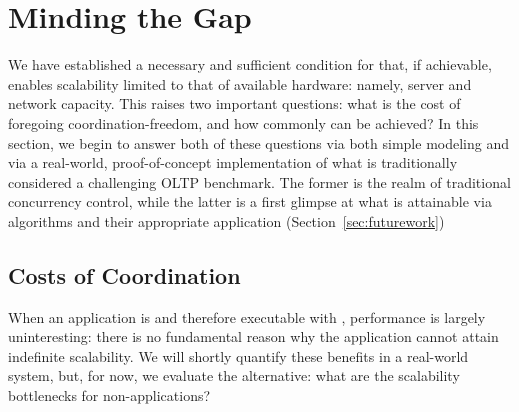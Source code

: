 
\section{Minding the Gap}
\label{sec:evaluation}

We have established a necessary and sufficient condition for \cfreedom
that, if achievable, enables scalability limited to that of available
hardware: namely, server and network capacity. This raises two
important questions: what is the cost of foregoing
coordination-freedom, and how commonly can \cfreedom be achieved? In
this section, we begin to answer both of these questions via both
simple modeling and via a real-world, proof-of-concept implementation
of what is traditionally considered a challenging OLTP benchmark. The
former is the realm of traditional concurrency control, while the
latter is a first glimpse at what is attainable via \cfree algorithms
and their appropriate application (Section~\ref{sec:futurework})

\subsection{Costs of Coordination}

When an application is \iconfluent and therefore executable with
\cfreedom, performance is largely uninteresting: there is no
fundamental reason why the application cannot attain indefinite
scalability. We will shortly quantify these benefits in a real-world
system, but, for now, we evaluate the alternative: what are the
scalability bottlenecks for non-\cfree applications?


